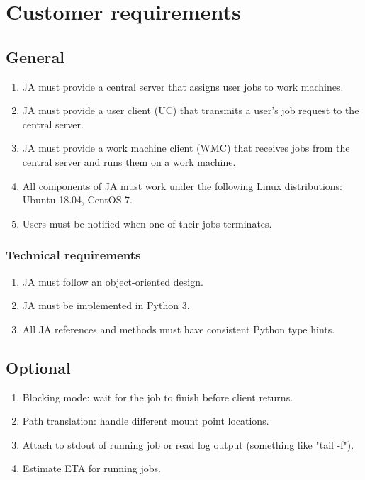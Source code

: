 \section{Customer requirements}
\subsection{General}
\begin{enumerate}
 \item JA must provide a central server that assigns user jobs to work machines.
 \item JA must provide a user client (UC) that transmits a user's job request to the central server.
 \item JA must provide a work machine client (WMC) that receives jobs from the central server and runs them on a work machine.
 \item All components of JA must work under the following Linux distributions: Ubuntu 18.04, CentOS 7.
 \item Users must be notified when one of their jobs terminates.
\end{enumerate}
\subsubsection{Technical requirements}
\begin{enumerate}
 \item JA must follow an object-oriented design.
 \item JA must be implemented in Python 3.
 \item All JA references and methods must have consistent Python type hints.
\end{enumerate}
\subsection{Optional}
\begin{enumerate}
 \item Blocking mode: wait for the job to finish before client returns.
 \item Path translation: handle different mount point locations.
 \item Attach to stdout of running job or read log output (something like "tail -f").
 \item Estimate ETA for running jobs.
\end{enumerate}
